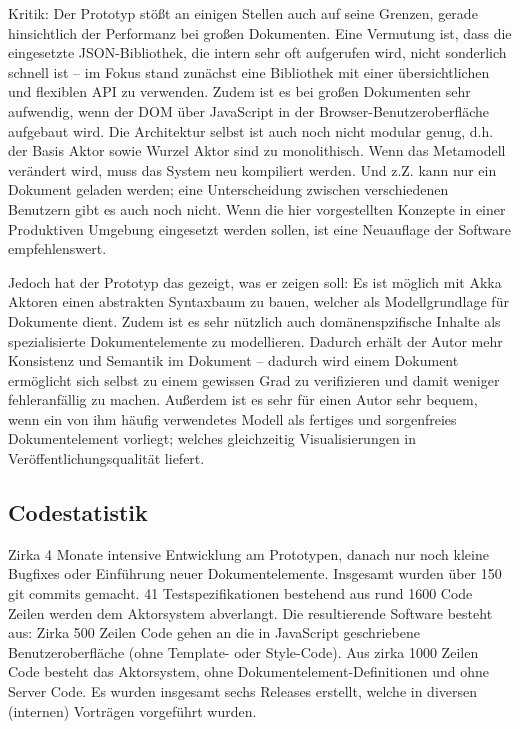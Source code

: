 Kritik: Der Prototyp stößt an einigen Stellen auch auf seine Grenzen, gerade hinsichtlich der Performanz bei großen Dokumenten. Eine Vermutung ist, dass die eingesetzte JSON-Bibliothek, die intern sehr oft aufgerufen wird, nicht sonderlich schnell ist --  im Fokus stand zunächst eine Bibliothek mit einer übersichtlichen und flexiblen API zu verwenden. Zudem ist es bei großen Dokumenten sehr aufwendig, wenn der DOM über JavaScript in der Browser-Benutzeroberfläche aufgebaut wird. Die Architektur selbst ist auch noch nicht modular genug, d.h. der Basis Aktor sowie Wurzel Aktor sind zu monolithisch. Wenn das Metamodell verändert wird, muss das System neu kompiliert werden. Und z.Z. kann nur ein Dokument geladen werden; eine Unterscheidung zwischen verschiedenen Benutzern gibt es auch noch nicht. Wenn die hier vorgestellten Konzepte in einer Produktiven Umgebung eingesetzt werden sollen, ist eine Neuauflage der Software empfehlenswert.

 
Jedoch hat der Prototyp das gezeigt, was er zeigen soll: Es ist möglich mit Akka Aktoren einen abstrakten Syntaxbaum zu bauen, welcher als Modellgrundlage für Dokumente dient. Zudem ist es sehr nützlich auch domänenspzifische Inhalte als spezialisierte Dokumentelemente zu modellieren. Dadurch erhält der Autor mehr Konsistenz und Semantik im Dokument -- dadurch wird einem Dokument ermöglicht sich selbst zu einem gewissen Grad zu verifizieren und damit weniger fehleranfällig zu machen. Außerdem ist es sehr für einen Autor sehr bequem, wenn ein von ihm häufig verwendetes Modell als fertiges und sorgenfreies Dokumentelement vorliegt; welches gleichzeitig Visualisierungen in Veröffentlichungsqualität liefert.

 
\subsection{Codestatistik}\label{}
 
Zirka 4 Monate intensive Entwicklung am Prototypen, danach nur noch kleine Bugfixes oder Einführung neuer Dokumentelemente. Insgesamt wurden über 150 git commits gemacht. 41 Testspezifikationen bestehend aus rund 1600 Code Zeilen werden dem Aktorsystem abverlangt. Die resultierende Software besteht aus: Zirka 500 Zeilen Code gehen an die in JavaScript geschriebene Benutzeroberfläche (ohne Template- oder Style-Code). Aus zirka 1000 Zeilen Code besteht das Aktorsystem, ohne Dokumentelement-Definitionen und ohne Server Code. Es wurden insgesamt sechs Releases erstellt, welche in diversen (internen) Vorträgen vorgeführt wurden.

